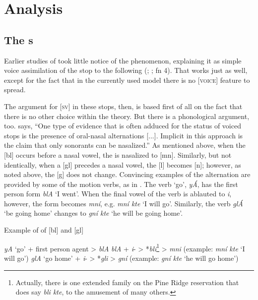 \documentclass[output=paper]{LSP/langsci}
\begin{document}
\section{Analysis}

\subsection{The s}

Earlier studies of   took little notice of the  phenomenon, explaining it as simple voice assimilation of the stop to the following  (\citealt[37]{Carter1974}; \citealt[7]{Shaw1980}; \citealt[22]{Patterson1990} fn 4). That works just as well, except for the fact that in the currently used model there is no [\textsc{voice}] feature to spread.

The argument for [\textsc{sv}] in these stops, then, is based first of all on the fact that there is no other choice within the theory. But there is a phonological argument, too. \citet[180]{Botma2011} says, ``One type of evidence that is often adduced for the  status of voiced stops is the presence of oral-nasal alternations [...]. Implicit in this approach is the claim that only sonorants can be nasalized.'' As mentioned above, when the [bl]  occurs before a nasal vowel, the  is nasalized to [mn]. Similarly, but not identically, when a [gl]  precedes a nasal vowel, the [l] becomes [n]; however, as noted above, the [g] does not change. Convincing examples of the alternation are provided by some of the motion verbs, as in . The verb `go', \textit{yÁ}, has the first person form \textit{blA} `I went'. When the final vowel of the verb is ablauted to \textit{i}, however, the form becomes \textit{mní}, e.g. \textit{mní kte} `I will go'. Similarly, the verb \textit{glÁ} `be going home' changes to \textit{gní kte} `he will be going home'.

\begin{exe}
\ex \label{ex:rood:9}
Example of  of [bl] and [gl]
\begin{xlist}
\ex \textit{yA} `go' + first person agent > \textit{blA}
\ex \textit{blA} + \textit{i}- > *\textit{bli}\footnote{Actually, there is one extended family on the Pine Ridge reservation that does say \textit{bli kte}, to the amusement of many others.} > \textit{mni} (example: \textit{mní kte} `I will go')
\ex \textit{glA} `go home' + \textit{i}- > *\textit{gli} > \textit{gní} (example: \textit{gní kte} `he will go home')
\end{xlist}
\end{exe}
\end{document}
